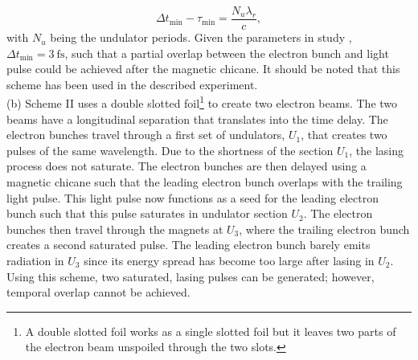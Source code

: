 \begin{equation}
\Delta t_{\text{min}}-\tau_{\text{min}}=\frac{N_{u} \lambda_{r}}{c},
\label{eq:alberto-beam-missmatch}
\end{equation}
with $N_{u}$ being the undulator periods. Given the parameters in study \cite{Lutman-2013-PRL}, $\Delta t_{\text{min}}=\SI{3}{\femto\second}$, such that a partial overlap between the electron bunch and light pulse could be achieved after the magnetic chicane. It should be noted that this scheme has been used in the described experiment.\\[1\baselineskip]
%
(b) Scheme II uses a double slotted foil\footnote{A double slotted foil works as a single slotted foil but it leaves two parts of the electron beam unspoiled through the two slots.} to create two electron beams. The two beams have a longitudinal separation that translates into the time delay. The electron bunches travel through a first set of undulators, $U_{1}$, that creates two pulses of the same wavelength. Due to the shortness of the section $U_{1}$, the lasing process does not saturate. The electron bunches are then delayed using a magnetic chicane such that the leading electron bunch overlaps with the trailing light pulse. This light pulse now functions as a seed for the leading electron bunch such that this pulse saturates in undulator section $U_{2}$. The electron bunches then travel through the magnets at $U_{3}$, where the trailing electron bunch creates a second saturated pulse. The leading electron bunch barely emits radiation in $U_{3}$ since its energy spread has become too large after lasing in $U_{2}$. Using this scheme, two saturated, lasing pulses can be generated; however, temporal overlap cannot be achieved.
%
%
%
%
